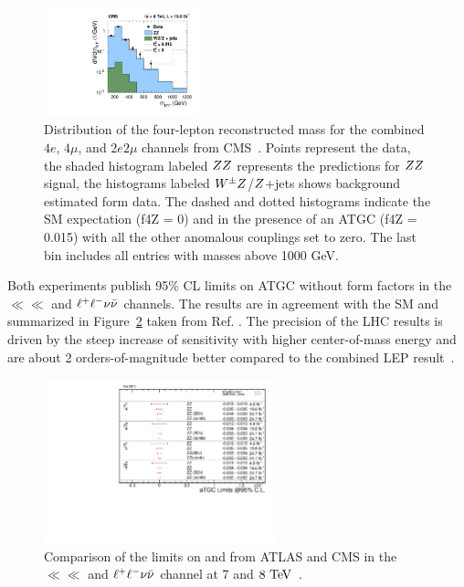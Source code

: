 \begin{figure}[htbp]
  \begin{center}
  \includegraphics[width=0.4\textwidth]{figures/sss-inclboson-diboson-zzprod-zzinvmass.pdf}
  \caption{ Distribution of the four-lepton reconstructed mass for the combined $4e$, $4\mu$, and $2e2\mu$ channels from CMS~\cite{CMS:2014xja}. Points represent the data, the shaded histogram labeled $ZZ$ represents the predictions for $ZZ$ signal, the histograms labeled $W^{\pm}Z$/$Z$+jets shows background estimated form data. The dashed and dotted histograms indicate the SM expectation (f4Z = 0) and in the presence of an ATGC (f4Z = 0.015) with all the other anomalous couplings set to zero. The last bin includes all entries with masses above 1000 GeV.
}
\label{fig:sss-inclboson-diboson-zzprod-zzinvmass}
\end{center}
\end{figure}

Both experiments publish 95\% CL limits on ATGC without form factors in the $\ll\ll$ 
and $\ell^+ \ell^-\nu\bar{\nu}$ channels. The results are in agreement with the SM and 
summarized in Figure~\ref{fig:sss-inclboson-diboson-zzprod-aTGC_naTGCf} 
taken from Ref. \cite{aTGCplots}. The precision of the LHC results is driven by the steep increase of 
sensitivity with higher center-of-mass energy
and are about 2 orders-of-magnitude better compared to the 
combined LEP result~\cite{LEP-comb-2002}.  
\begin{figure}[htbp]
  \begin{center}
  \includegraphics[width=0.6\textwidth]{figures/sss-inclboson-diboson-zzprod-aTGC_naTGCf.pdf}
  \caption{ Comparison of the limits on \ffourv{} and \ffivev{} from ATLAS and CMS in the $\ll\ll$ and $\ell^+ \ell^-\nu\bar{\nu}$
  channel at 7 and $8\TeV$~\cite{aTGCplots}.}
\label{fig:sss-inclboson-diboson-zzprod-aTGC_naTGCf}
\end{center}
\end{figure}







